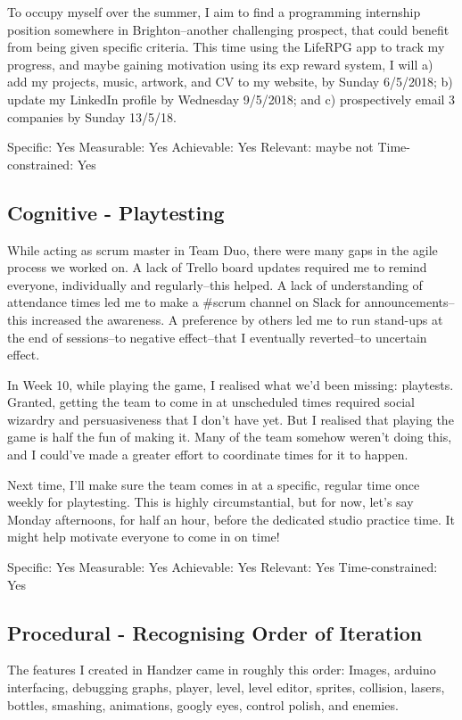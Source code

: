 \documentclass{scrartcl}
\begin{document}
To occupy myself over the summer, I aim to find a programming internship position somewhere in Brighton--another challenging prospect, that could benefit from being given specific criteria. This time using the LifeRPG app to track my progress, and maybe gaining motivation using its exp reward system, I will a) add my projects, music, artwork, and CV to my website, by Sunday 6/5/2018; b) update my LinkedIn profile by Wednesday 9/5/2018; and c) prospectively email 3 companies by Sunday 13/5/18.

Specific: Yes
Measurable: Yes
Achievable: Yes
Relevant: maybe not
Time-constrained: Yes

\subsection{Cognitive - Playtesting} %
While acting as scrum master in Team Duo, there were many gaps in the agile process we worked on. A lack of Trello board updates required me to remind everyone, individually and regularly--this helped. A lack of understanding of attendance times led me to make a #scrum channel on Slack for announcements--this increased the awareness. A preference by others led me to run stand-ups at the end of sessions--to negative effect--that I eventually reverted--to uncertain effect.

In Week 10, while playing the game, I realised what we'd been missing: playtests. Granted, getting the team to come in at unscheduled times required social wizardry and persuasiveness that I don't have yet. But I realised that playing the game is half the fun of making it. Many of the team somehow weren't doing this, and I could've made a greater effort to coordinate times for it to happen.

Next time, I'll make sure the team comes in at a specific, regular time once weekly for playtesting. This is highly circumstantial, but for now, let's say Monday afternoons, for half an hour, before the dedicated studio practice time. It might help motivate everyone to come in on time!

Specific: Yes
Measurable: Yes
Achievable: Yes
Relevant: Yes
Time-constrained: Yes

\subsection{Procedural - Recognising Order of Iteration} %
The features I created in Handzer came in roughly this order: Images, arduino interfacing, debugging graphs, player, level, level editor, sprites, collision, lasers, bottles, smashing, animations, googly eyes, control polish, and enemies.
\end{document}
